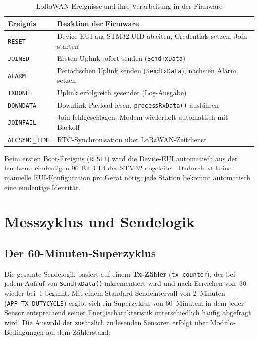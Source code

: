 \begin{table}[H]
  \centering
  \begin{tabular}{ll}
    \hline
    \textbf{Ereignis} & \textbf{Reaktion der Firmware} \\
    \hline
    \texttt{RESET}         & Device-EUI aus STM32-UID ableiten, Credentials setzen, Join starten \\
    \texttt{JOINED}        & Ersten Uplink sofort senden (\texttt{SendTxData}) \\
    \texttt{ALARM}         & Periodischen Uplink senden (\texttt{SendTxData}), nächsten Alarm setzen \\
    \texttt{TXDONE}        & Uplink erfolgreich gesendet (Log-Ausgabe) \\
    \texttt{DOWNDATA}      & Downlink-Payload lesen, \texttt{processRxData()} ausführen \\
    \texttt{JOINFAIL}      & Join fehlgeschlagen; Modem wiederholt automatisch mit Backoff \\
    \texttt{ALCSYNC\_TIME} & RTC-Synchronisation über LoRaWAN-Zeitdienst \\
    \hline
  \end{tabular}
  \caption{LoRaWAN-Ereignisse und ihre Verarbeitung in der Firmware}
  \label{tab:events}
\end{table}

Beim ersten Boot-Ereignis (\texttt{RESET}) wird die Device-EUI automatisch aus der hardware-eindeutigen 96-Bit-UID des STM32 abgeleitet. Dadurch ist keine manuelle EUI-Konfiguration pro Gerät nötig; jede Station bekommt automatisch eine eindeutige Identität.

\newpage

\section*{Messzyklus und Sendelogik}

\subsection*{Der 60-Minuten-Superzyklus}

Die gesamte Sendelogik basiert auf einem \textbf{Tx-Zähler} (\texttt{tx\_counter}), der bei jedem Aufruf von \texttt{SendTxData()} inkrementiert wird und nach Erreichen von~30 wieder bei~1 beginnt. Mit einem Standard-Sendeintervall von 2~Minuten (\texttt{APP\_TX\_DUTYCYCLE}) ergibt sich ein Superzyklus von 60~Minuten, in dem jeder Sensor entsprechend seiner Energiecharakteristik unterschiedlich häufig abgefragt wird. Die Auswahl der zusätzlich zu lesenden Sensoren erfolgt über Modulo-Bedingungen auf dem Zählerstand:

